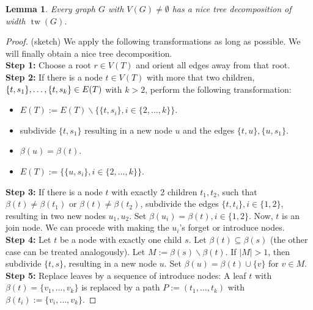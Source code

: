\documentclass[11pt,a4paper]{article}
\newtheorem*{lemma}{Lemma}
\DeclareMathOperator{\tw}{tw}
\begin{document}
\begin{lemma}
Every graph $G$ with $V(G) \not = \emptyset$ has a nice tree decomposition of width $\tw(G)$.
\end{lemma}

\begin{proof}(sketch)
We apply the following transformations as long as possible. We will finally obtain a nice tree decomposition. \\

\textbf{Step 1:} Choose a root $r \in V(T)$ and orient all edges away from that root. \\

\textbf{Step 2:} If there is a node $t \in V(T)$ with more that two children, $\{t, s_{1}\}, \dots, \\ \{t, s_{k}\} \in E(T)$ with $k > 2$, perform the following transformation: \\

\begin{itemize}
\item $E(T) := E(T) \backslash \{\{t, s_{i}\}, i \in \{2, \dots, k\}\}$.
\item subdivide $\{t, s_{1}\}$ resulting in a new node $u$ and the edges $\{t, u\}, \{u, s_{1}\}$.
\item $\beta(u) = \beta(t)$.
\item $E(T) := \{\{u, s_{i}\}, i \in \{2, \dots, k\}\}$.
\end{itemize}

\textbf{Step 3:} If there is a node $t$ with exactly 2 children $t_{1}, t_{2}$, such that $\beta(t) \not = \beta(t_{1})$ or $\beta(t) \not = \beta(t_{2})$, subdivide the edges $\{t, t_{i}\}, i \in \{1,2\}$, resulting in two new nodes $u_{1}, u_{2}$. Set $\beta(u_{i}) = \beta(t), i \in \{1,2\}$. Now, $t$ is an join node. We can procede with making the $u_{i}$'s forget or introduce nodes. \\

\textbf{Step 4:} Let $t$ be a node with exactly one child $s$. Let $\beta(t) \subseteq \beta(s)$ (the other case can be treated analogously). Let $M := \beta(s) \backslash \beta(t)$. If $|M| > 1$, then subdivide $\{t, s\}$, resulting in a new node $u$. Set $\beta(u) = \beta(t) \cup \{v\}$ for $v \in M$. \\

\textbf{Step 5:} Replace leaves by a sequence of introduce nodes: A leaf $t$ with $\beta(t) = \{v_{1}, \dots, v_{k}\}$ is replaced by a path $P := (t_{1}, \dots, t_{k})$ with $\beta(t_{i}) := \{v_{i}, \dots, v_{k}\}$.
\end{proof}
\end{document}
